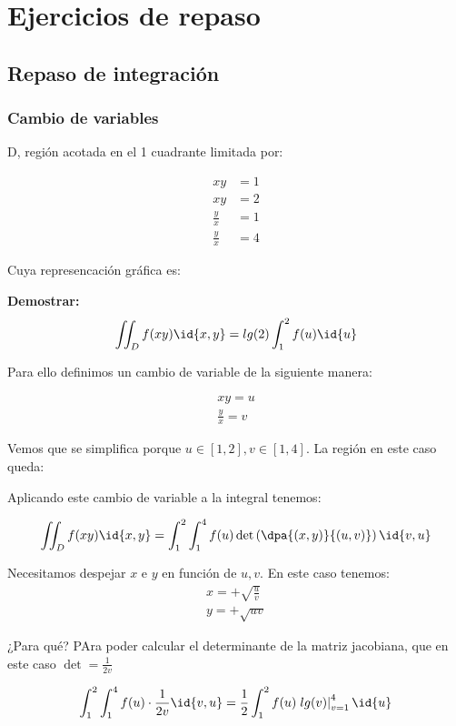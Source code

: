 \section{Ejercicios de repaso}
\subsection{Repaso de integración}
\subsubsection{Cambio de variables}

D, región acotada en el 1 cuadrante limitada por:

\[\begin{array}{cc}
xy&=1\\xy&=2\\\frac{y}{x} &=1\\\frac{y}{x}&=4
\end{array}\]

Cuya represencación gráfica es:


\textbf{Demostrar:}\[\iint_D f(xy)\id{x,y} = lg(2)\int_1^2f(u)\id{u}\]

Para ello definimos un cambio de variable de la siguiente manera:

\begin{gather*}
xy=u\\
\frac{y}{x}=v
\end{gather*}

Vemos que se simplifica porque $u\in[1,2],v\in[1,4]$. La región en este caso queda:


Aplicando este cambio de variable a la integral tenemos:

\[\iint_D f(xy)\id{x,y} = \int_1^2\int_1^4 f(u) \det \left(\dpa{(x,y)}{(u,v)}\right)\id{v,u}\]

Necesitamos despejar $x$ e $y$ en función de $u,v$. En este caso tenemos: 
\begin{gather*}
x=+\sqrt{\frac{u}{v}}\\ y= + \sqrt{uv}
\end{gather*}

¿Para qué? PAra poder calcular el determinante de la matriz jacobiana, que en este caso $\displaystyle\det = \frac{1}{2v}$

\[\int_1^2\int_1^4 f(u)\cdot  \frac{1}{2v}\id{v,u} = \frac{1}{2} \int_1^2 f(u) \left.lg(v)\right|_{v=1}^4 \id{u}\]

